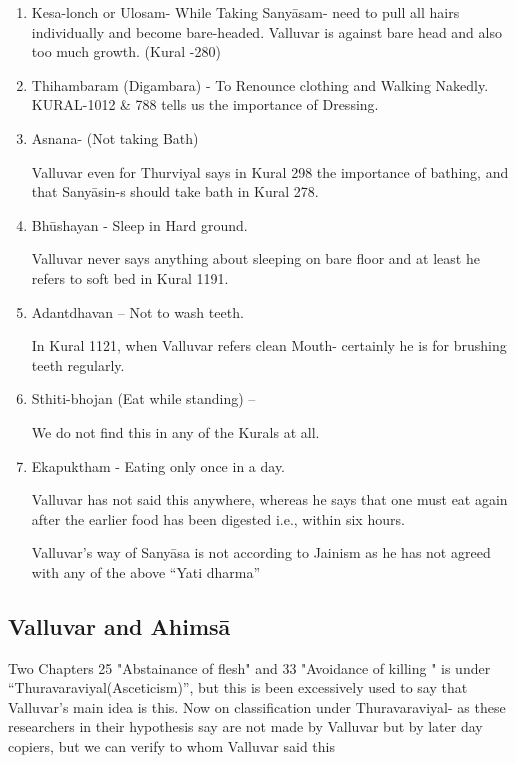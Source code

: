 \begin{enumerate}[{\rm 1)}]
\itemsep=0pt
\item Kesa-lonch or Ulosam- While Taking Sanyāsam- need to pull all hairs individually and become bare-headed. Valluvar is against bare head and also too much growth. (Kural -280)
 
 \item Thihambaram (Digambara) - To Renounce clothing and Walking Nakedly. KURAL-1012 \& 788 tells us the importance of Dressing.
 
 \item 
 Asnana- (Not taking Bath)

 Valluvar even for Thurviyal says in Kural 298 the importance of bathing, and that Sanyāsin-s should take bath in Kural 278.

 \item 
 Bhūshayan - Sleep in Hard ground.

 Valluvar never says anything about sleeping on bare floor and at least he refers to soft bed in Kural 1191.

 \item 
 Adantdhavan – Not to wash teeth.

 In Kural 1121, when Valluvar refers clean Mouth- certainly he is for brushing teeth regularly.

 \item 
 Sthiti-bhojan (Eat while standing) –

 We do not find this in any of the Kurals at all.

 \item 
 Ekapuktham - Eating only once in a day.

 Valluvar has not said this anywhere, whereas he says that one must eat again after the earlier food has been digested i.e., within six hours.

 Valluvar’s way of Sanyāsa is not according to Jainism as he has not agreed with any of the above “Yati dharma”

\end{enumerate}


\subsection*{Valluvar and Ahimsā}

Two Chapters 25 "Abstainance of flesh" and 33 "Avoidance of killing " is under “Thuravaraviyal(Asceticism)”, but this is been excessively used to say that Valluvar’s main idea is this. Now on classification under Thuravaraviyal- as these researchers in their hypothesis say are not made by Valluvar but by later day copiers, but we can verify to whom Valluvar said this

